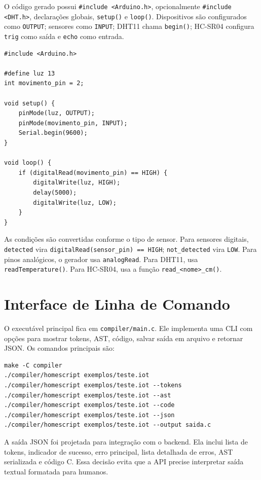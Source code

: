 \documentclass[conference]{IEEEtran}
\begin{document}
O código gerado possui \texttt{\#include <Arduino.h>}, opcionalmente \texttt{\#include <DHT.h>}, declarações globais, \texttt{setup()} e \texttt{loop()}. Dispositivos são configurados como \texttt{OUTPUT}; sensores como \texttt{INPUT}; DHT11 chama \texttt{begin()}; HC-SR04 configura \texttt{trig} como saída e \texttt{echo} como entrada.

\begin{lstlisting}[style=csmall,caption={Exemplo de código C/Arduino gerado.},label={lst:generated}]
#include <Arduino.h>

#define luz 13
int movimento_pin = 2;

void setup() {
    pinMode(luz, OUTPUT);
    pinMode(movimento_pin, INPUT);
    Serial.begin(9600);
}

void loop() {
    if (digitalRead(movimento_pin) == HIGH) {
        digitalWrite(luz, HIGH);
        delay(5000);
        digitalWrite(luz, LOW);
    }
}
\end{lstlisting}

As condições são convertidas conforme o tipo de sensor. Para sensores digitais, \texttt{detected} vira \texttt{digitalRead(sensor\_pin) == HIGH}; \texttt{not\_detected} vira \texttt{LOW}. Para pinos analógicos, o gerador usa \texttt{analogRead}. Para DHT11, usa \texttt{readTemperature()}. Para HC-SR04, usa a função \texttt{read\_<nome>\_cm()}.

\section{Interface de Linha de Comando}

O executável principal fica em \texttt{compiler/main.c}. Ele implementa uma CLI com opções para mostrar tokens, AST, código, salvar saída em arquivo e retornar JSON. Os comandos principais são:

\begin{lstlisting}[basicstyle=\ttfamily\scriptsize,frame=single,breaklines=true]
make -C compiler
./compiler/homescript exemplos/teste.iot
./compiler/homescript exemplos/teste.iot --tokens
./compiler/homescript exemplos/teste.iot --ast
./compiler/homescript exemplos/teste.iot --code
./compiler/homescript exemplos/teste.iot --json
./compiler/homescript exemplos/teste.iot --output saida.c
\end{lstlisting}

A saída JSON foi projetada para integração com o backend. Ela inclui lista de tokens, indicador de sucesso, erro principal, lista detalhada de erros, AST serializada e código C. Essa decisão evita que a API precise interpretar saída textual formatada para humanos.
\end{document}
